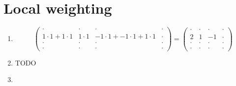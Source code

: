 \documentclass[DIN, pagenumber=false, fontsize=11pt, parskip=half]{scrartcl}
\begin{document}
    \section{Local weighting}
    \begin{enumerate}
        \item 
            \begin{equation*}
                \begin{pmatrix}
                    \cdot & \cdot & \cdot & \cdot \\
                    1 \cdot 1 + 1 \cdot 1 & 1 \cdot 1 & -1 \cdot 1 + -1 \cdot 1 + 1 \cdot 1  & \cdot \\
                    \cdot & \cdot & \cdot & \cdot \\
                    \cdot & \cdot & \cdot & \cdot
                \end{pmatrix} =
                \begin{pmatrix}
                    \cdot & \cdot & \cdot & \cdot \\
                    2 & 1 & -1 & \cdot \\
                    \cdot & \cdot & \cdot & \cdot \\
                    \cdot & \cdot & \cdot & \cdot
                \end{pmatrix}
            \end{equation*}
        \item TODO
        \item $ $ 
    \end{enumerate}
\end{document}
